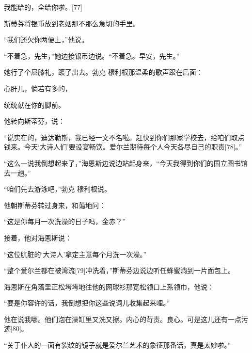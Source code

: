 \documentclass{article}
\begin{document}
我能给的，全给你啦。[77]



斯蒂芬将银币放到老姻那不那么急切的手里。



“我们还欠你两便士，”他说。



“不着急，先生，”她边接银币边说。“不着急。早安，先生。”



她行了个屈膝礼，踱了出去。勃克 \cdot 穆利根那温柔的歌声跟在后面：



心肝儿，倘若有多的，



统统献在你的脚前。



他转向斯蒂芬，说：



“说实在的，迪达勒斯，我已经一文不名啦。赶快到你们那家学校去，给咱们取点钱来。今天‘大诗人们’要设宴畅饮。爱尔兰期待每个人今天各尽自己的职责[78]。”



“这么一说我倒想起来了，”海恩斯边说边站起身来，“今天我得到你们的国立图书馆去一趟。”



“咱们先去游泳吧，”勃克 \cdot 穆利根说。



他朝斯蒂芬转过身来，和蔼地问：



“这是你每月一次洗澡的日子吗，金赤？”



接着，他对海恩斯说：



“这位肮脏的‘大诗人’拿定主意每个月洗一次澡。”



“整个爱尔兰都在被湾流[79]冲洗着，”斯蒂芬边说边听任蜂蜜淌到一片面包上。



海恩斯在角落里正松垮垮地往他的网球衫那宽松领口上系领巾，他说：



“要是你容许的话，我倒想把你这些说词儿收集起来哩。”



他在说我哪。他们泡在澡缸里又洗又擦。内心的苛责。良心。可是这儿还有一点污迹[80]。



“关于仆人的一面有裂纹的镜子就是爱尔兰艺术的象征那番话，真是太妙啦。”
\end{document}
